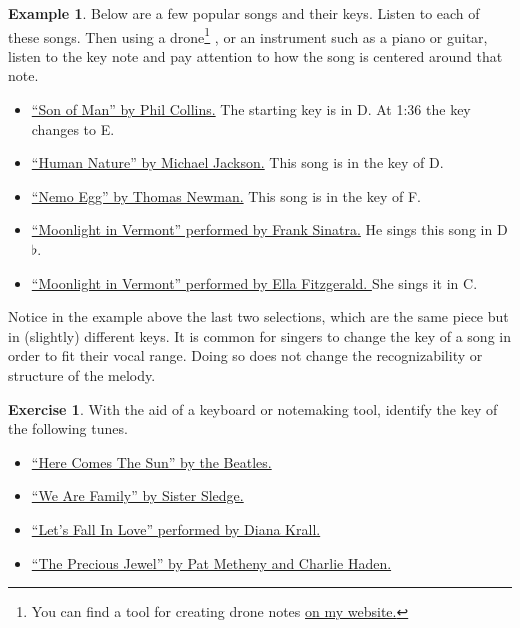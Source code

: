 \documentclass[12pt]{article}
\theoremstyle{definition}
\newtheorem{exercise}{Exercise}
\newtheorem*{example}{Example}
\begin{document}
\begin{example}
Below are a few popular songs and their keys. 
Listen to each of these songs. Then using a drone\footnote{You can find a tool for creating drone notes \href{https://ahballif.github.io/AddisonGuitarResources/drones.html}{on my website.}}
, or an instrument such as a piano or guitar, listen to the key note and pay attention to 
how the song is centered around that note. 
\begin{itemize}
\item \href{https://www.youtube.com/watch?v=tiBaBca7-rY}{``Son of Man'' by Phil Collins.} The starting key is in D. At 1:36 the key changes to E.
\item \href{https://www.youtube.com/watch?v=ElN_4vUvTPs}{``Human Nature'' by Michael Jackson.} This song is in the key of D.

\item \href{https://www.youtube.com/watch?v=sKljOD5B71k}{``Nemo Egg'' by Thomas Newman.} This song is in the key of F.

\item \href{https://www.youtube.com/watch?v=KuAAroUML0g}{``Moonlight in Vermont'' performed by Frank Sinatra.} He sings this song in D$\flat$. 

\item \href{https://www.youtube.com/watch?v=WJCw-lvuS-c}{``Moonlight in Vermont'' performed by Ella Fitzgerald. } She sings it in C.

\end{itemize}
\end{example}

Notice in the example above the last two selections, which are the same piece but in (slightly) different keys. 
It is common for singers to change the key of a song in order to fit their vocal range. 
Doing so does not change the recognizability or structure of the melody. 


\begin{exercise} \label{ex:findkeys}
With the aid of a keyboard or notemaking tool, identify the key of the following tunes. 
\begin{itemize}
\item \href{https://www.youtube.com/watch?v=xUNqsfFUwhY}{``Here Comes The Sun'' by the Beatles.}
\item \href{https://www.youtube.com/watch?v=hNvN8uAIUQ4}{``We Are Family'' by Sister Sledge.}
\item \href{https://www.youtube.com/watch?v=muOpokalL0s}{``Let's Fall In Love'' performed by Diana Krall.}
\item \href{https://www.youtube.com/watch?v=CbGy_Vf1HgU}{``The Precious Jewel'' by Pat Metheny and Charlie Haden.}
\end{itemize}
\end{exercise}
\end{document}
